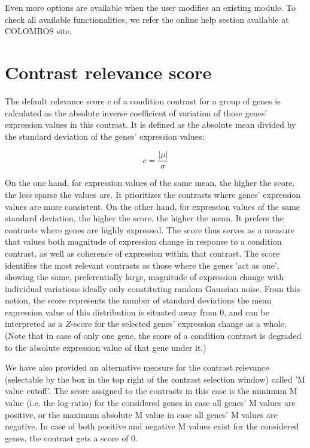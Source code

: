 Even more options are available when the user modifies an existing
module.  To check all available functionalities, we refer the online
help section available at COLOMBOS site.



\section{Contrast relevance score}\label{apd:contrast-score}

The default relevance score $c$ of a condition contrast for a group
of genes is calculated as the absolute inverse coefficient of
variation of those genes’ expression values in this contrast. It
is defined as the absolute mean divided by the standard deviation
of the genes’ expression values:

\begin{equation}
c=\frac{|\mu|}{\sigma}
\end{equation}
 
On the one hand, for expression values of the same mean, the
higher the score, the less sparse the values are. It prioritizes
the contrasts where genes’ expression values are more
consistent. On the other hand, for expression values of the same
standard deviation, the higher the score, the higher the mean. It
prefers the contrasts where genes are highly expressed. The score
thus serves as a measure that values both magnitude of expression
change in response to a condition contrast, as well as coherence
of expression within that contrast. The score identifies the most
relevant contrasts as those where the genes 'act as one', showing
the same, preferentially large, magnitude of expression change
with individual variations ideally only constituting random
Gaussian noise. From this notion, the score represents the number
of standard deviations the mean expression value of this
distribution is situated away from $0$, and can be interpreted as a
$Z$-score for the selected genes' expression change as a
whole. (Note that in case of only one gene, the score of a
condition contrast is degraded to the absolute expression value
of that gene under it.)

We have also provided an alternative measure for the contrast
relevance (selectable by the box in the top right of the contrast
selection window) called 'M value cutoff'.  The score assigned to
the contrasts in this case is the minimum M value (i.e. the
log-ratio) for the considered genes in case all genes' M values
are positive, or the maximum absolute M value in case all genes'
M values are negative.  In case of both positive and negative M
values exist for the considered genes, the contrast gets a score
of 0.



